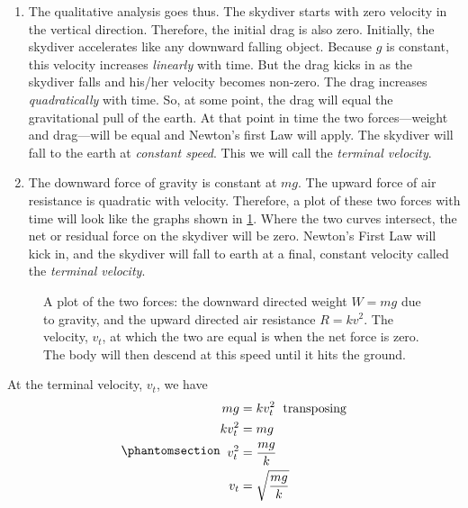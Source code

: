 \documentclass[
  a4paper,
]{article}
\begin{document}
\begin{enumerate}
\def\labelenumi{(\alph{enumi})}
\item
  The qualitative analysis goes thus. The skydiver starts with zero
  velocity in the vertical direction. Therefore, the initial drag is
  also zero. Initially, the skydiver accelerates like any downward
  falling object. Because \(g\) is constant, this velocity increases
  \emph{linearly} with time. But the drag kicks in as the skydiver falls
  and his/her velocity becomes non-zero. The drag increases
  \emph{quadratically} with time. So, at some point, the drag will equal
  the gravitational pull of the earth. At that point in time the two
  forces---weight and drag---will be equal and Newton's first Law will
  apply. The skydiver will fall to the earth at \emph{constant speed}.
  This we will call the \emph{terminal velocity}.
\item
  The downward force of gravity is constant at \(mg\). The upward force
  of air resistance is quadratic with velocity. Therefore, a plot of
  these two forces with time will look like the graphs shown in
  \cref{fig:terminal-velocity}. Where the two curves intersect, the net
  or residual force on the skydiver will be zero. Newton's First Law
  will kick in, and the skydiver will fall to earth at a final, constant
  velocity called the \emph{terminal velocity}.
\end{enumerate}

\begin{figure}
\centering

\caption{A plot of the two forces: the downward directed weight
\(W = mg\) due to gravity, and the upward directed air resistance
\(R = kv^2\). The velocity, \(v_t\), at which the two are equal is when
the net force is zero. The body will then descend at this speed until it
hits the ground.}\label{fig:terminal-velocity}
\end{figure}

At the terminal velocity, \(v_t\), we have
\begin{equation}\phantomsection\label{eq:value-vt}{
\begin{aligned}
mg &= kv_t^2\; \text{ transposing}\\
kv_{t}^2 &= mg\\
v_t^{2} &= \frac{mg}{k}\\
v_t &= \sqrt{\frac{mg}{k}}
\end{aligned}
}\end{equation}
\end{document}
